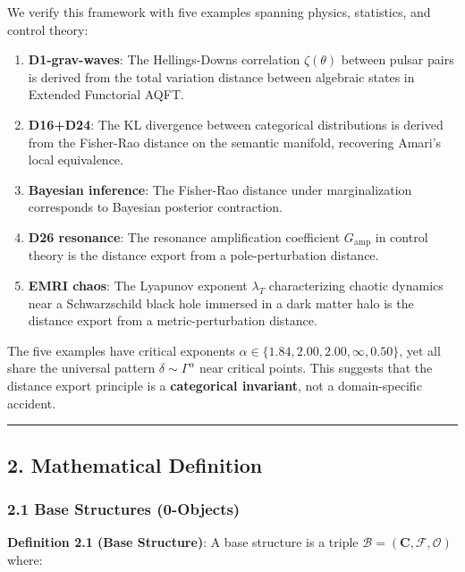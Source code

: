 \documentclass[
]{article}
\providecommand{\tightlist}{%
  \setlength{\itemsep}{0pt}\setlength{\parskip}{0pt}}
\begin{document}
We verify this framework with five examples spanning physics,
statistics, and control theory:

\begin{enumerate}
\def\labelenumi{\arabic{enumi}.}
\tightlist
\item
  \textbf{D1-grav-waves}: The Hellings-Downs correlation
  \(\zeta(\theta)\) between pulsar pairs is derived from the total
  variation distance between algebraic states in Extended Functorial
  AQFT.
\item
  \textbf{D16+D24}: The KL divergence between categorical distributions
  is derived from the Fisher-Rao distance on the semantic manifold,
  recovering Amari's local equivalence.
\item
  \textbf{Bayesian inference}: The Fisher-Rao distance under
  marginalization corresponds to Bayesian posterior contraction.
\item
  \textbf{D26 resonance}: The resonance amplification coefficient
  \(G_{\text{amp}}\) in control theory is the distance export from a
  pole-perturbation distance.
\item
  \textbf{EMRI chaos}: The Lyapunov exponent \(\lambda_T\)
  characterizing chaotic dynamics near a Schwarzschild black hole
  immersed in a dark matter halo is the distance export from a
  metric-perturbation distance.
\end{enumerate}

The five examples have critical exponents
\(\alpha \in \{1.84, 2.00, 2.00, \infty, 0.50\}\), yet all share the
universal pattern \(\delta \sim \Gamma^\alpha\) near critical points.
This suggests that the distance export principle is a
\textbf{categorical invariant}, not a domain-specific accident.

\begin{center}\rule{0.5\linewidth}{0.5pt}\end{center}

\subsection{2. Mathematical Definition}\label{mathematical-definition}

\subsubsection{2.1 Base Structures
(0-Objects)}\label{base-structures-0-objects}

\textbf{Definition 2.1 (Base Structure)}: A base structure is a triple
\(\mathcal{B} = (\mathbf{C}, \mathcal{F}, \mathcal{O})\) where:
\end{document}
